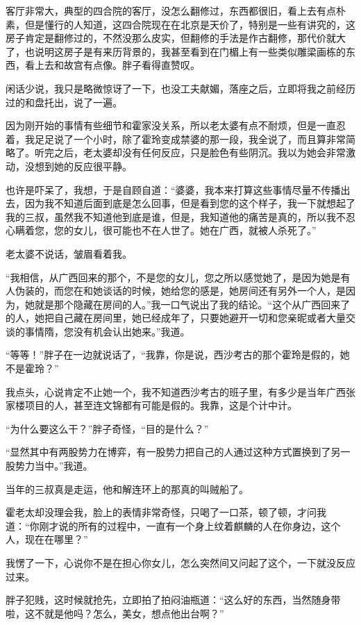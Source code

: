 客厅非常大，典型的四合院的客厅，没怎么翻修过，东西都很旧，看上去有点朴素，但是懂行的人知道，这四合院现在在北京是天价了，特别是一些有讲究的，这房子肯定是翻修过的，不然没那么皮实，但翻修的手法是作古翻修，那代价就大了，也说明这房子是有来历背景的，我甚至看到在门楣上有一些类似雕梁画栋的东西，看上去和故宫有点像。胖子看得直赞叹。

闲话少说，我只是略微惊讶了一下，也没工夫献媚，落座之后，立即将我之前经历过的和盘托出，说了一遍。

因为刚开始的事情有些细节和霍家没关系，所以老太婆有点不耐烦，但是一直忍着，我足足说了一个小时，除了霍玲变成禁婆的那一段，我全说了，而且算非常简略了。听完之后，老太婆却没有任何反应，只是脸色有些阴沉。我以为她会非常激动，没想到她的反应很平静。

也许是吓呆了，我想，于是自顾自道：“婆婆，我本来打算这些事情尽量不传播出去，因为我不知道后面到底是怎么回事，但是看到您的这个样子，我一下就想起了我的三叔，虽然我不知道他到底是谁，但是，我知道他的痛苦是真的，所以我不忍心瞒着您，您的女儿，很可能也不在人世了。她在广西，就被人杀死了。”

老太婆不说话，皱眉看着我。

“我相信，从广西回来的那个，不是您的女儿，您之所以感觉她了，是因为她是有人伪装的，而您在和她谈话的时候，她给您的感是，她房间还有另外一个人，是因为，她就是那个隐藏在房间的人。”我一口气说出了我的结论。“这个从广西回来了的人，她把自己藏在房间里，她已经成年了，只要她避开一切和您亲昵或者大量交谈的事情隋，您没有机会认出她来。”我道。

“等等！”胖子在一边就说话了，“我靠，你是说，西沙考古的那个霍玲是假的，她不是霍玲？”

我点头，心说肯定不止她一个，我不知道西沙考古的班子里，有多少是当年广西张家楼项目的人，甚至连文锦都有可能是假的。我靠，这是个计中计。

“为什么要这么干？”胖子奇怪，“目的是什么？”

“显然其中有两股势力在博弈，有一股势力把自己的人通过这种方式置换到了另一股势力当中。”我道。

当年的三叔真是走运，他和解连环上的那真的叫贼船了。

霍老太却没理会我，脸上的表情非常奇怪，只喝了一口茶，顿了顿，才问我道：“你刚才说的所有的过程中，一直有一个身上纹着麒麟的人在你身边，这个人，现在在哪里？”

我愣了一下，心说你不是在担心你女儿，怎么突然间又问起了这个，一下就没反应过来。

胖子犯贱，这时候就抢先，立即拍了拍闷油瓶道：“这么好的东西，当然随身带啦，这不就是他吗？怎么，美女，想点他出台啊？”

